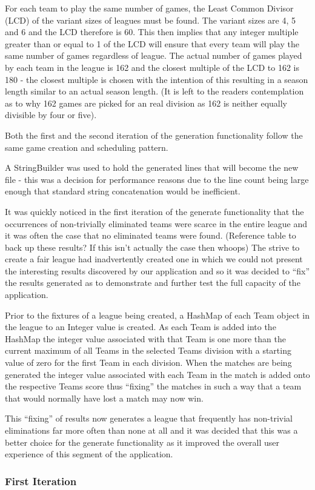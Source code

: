 For each team to play the same number of games, the Least Common
Divisor (LCD) of the variant sizes of leagues must be found. The
variant sizes are 4, 5 and 6 and the LCD therefore is 60. This then
implies that any integer multiple greater than or equal to 1 of the
LCD will ensure that every team will play the same number of games
regardless of league. The actual number of games played by each team
in the league is 162 and the closest multiple of the LCD to 162 is 180
- the closest multiple is chosen with the intention of this resulting
in a season length similar to an actual season length. (It is left to
the readers contemplation as to why 162 games are picked for an real
division as 162 is neither equally divisible by four or five).

Both the first and the second iteration of the generation
functionality follow the same game creation and scheduling pattern. 


A StringBuilder was used to hold the generated lines that will become
the new file - this was a decision for performance reasons due to the
line count being large enough that standard string concatenation would
be inefficient.

It was quickly noticed in the first iteration of the generate
functionality that the occurrences of non-trivially eliminated teams
were scarce in the entire league and it was often the case that no
eliminated teams were found. (Reference table to back up these
results? If this isn't actually the case then whoops) The strive to
create a fair league had inadvertently created one in which we could
not present the interesting results discovered by our application and
so it was decided to ``fix'' the results generated as to demonstrate
and further test the full capacity of the application.

Prior to the fixtures of a league being created, a HashMap of each
Team object in the league to an Integer value is created. As each Team
is added into the HashMap the integer value associated with that Team
is one more than the current maximum of all Teams in the selected
Teams division with a starting value of zero for the first Team in
each division. When the matches are being generated the integer value
associated with each Team in the match is added onto the respective
Teams score thus ``fixing'' the matches in such a way that a team that
would normally have lost a match may now win. 

This ``fixing'' of results now generates a league that frequently has
non-trivial eliminations far more often than none at all and it was
decided that this was a better choice for the generate functionality
as it improved the overall user experience of this segment of the
application. 


\subsubsection{First Iteration}

